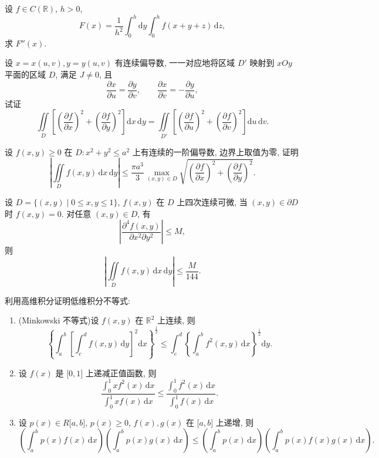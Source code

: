 \documentclass[../../数学分析培优讲义.tex]{subfiles}
\begin{document}
\begin{example}
设 $f\in C(\mathbb{R})$, $h>0$,
\[
    F(x)=\dfrac{1}{h^2}\int_0^h\mathrm{d}y\int_0^h f(x+y+z)\,\mathrm{d}z,
\]
求 $F''(x)$.
\end{example}
\exampleblank

\begin{example}
设 $x=x(u,v),y=y(u,v)$ 有连续偏导数, 一一对应地将区域 $D'$ 映射到 $xOy$ 平面的区域 $D$, 满足 $J\ne0$, 且
\[
    \dfrac{\partial x}{\partial u}=\dfrac{\partial y}{\partial v},\qquad
    \dfrac{\partial x}{\partial v}=-\dfrac{\partial y}{\partial u},
\]
试证
\[
    \iint\limits_D\left[\left(\dfrac{\partial f}{\partial x}\right)^2+
    \left(\dfrac{\partial f}{\partial y}\right)^2\right]\mathrm{d}x\,\mathrm{d}y
    =\iint\limits_{D'}\left[\left(\dfrac{\partial f}{\partial u}\right)^2+
    \left(\dfrac{\partial f}{\partial v}\right)^2\right]\mathrm{d}u\,\mathrm{d}v.
\]
\end{example}
\exampleblank

\begin{example}
设 $f(x,y)\geq0$ 在 $D:x^2+y^2\leq a^2$ 上有连续的一阶偏导数, 边界上取值为零, 证明
\[
    \left|\iint\limits_Df(x,y)\,\mathrm{d}x\,\mathrm{d}y\right|
    \leq\dfrac{\pi a^3}{3}
    \max_{(x,y)\in D}\sqrt{\left(\dfrac{\partial f}{\partial x}\right)^2+
    \left(\dfrac{\partial f}{\partial y}\right)^2}.
\]
\end{example}
\exampleblank

\begin{example}
设 $D=\{(x,y)\mid0\leq x,y\leq1\}$, $f(x,y)$ 在 $D$ 上四次连续可微, 当 $(x,y)\in\partial D$ 时 $f(x,y)=0$. 对任意 $(x,y)\in D$, 有
\[
    \left|\dfrac{\partial^4f(x,y)}{\partial x^2\partial y^2}\right|\leq M,
\]
则
\[
    \left|\iint\limits_Df(x,y)\,\mathrm{d}x\,\mathrm{d}y\right|\leq\dfrac{M}{144}.
\]
\end{example}
\exampleblank

\begin{example}[\markstar]
利用高维积分证明低维积分不等式:
\begin{enumerate}[label=(\arabic*)]
    \item (Minkowski 不等式)设 $f(x,y)$ 在 $\mathbb{R}^2$ 上连续, 则
    \[
        \left\{\int_a^b\left[\int_c^d f(x,y)\,\mathrm{d}y\right]^2\mathrm{d}x\right\}^{\frac{1}{2}}
        \leq
        \int_c^d\left\{\int_a^b f^2(x,y)\,\mathrm{d}x\right\}^{\frac{1}{2}}\mathrm{d}y.
    \]
    \item 设 $f(x)$ 是 $\lbrack0,1\rbrack$ 上递减正值函数, 则
    \[
        \dfrac{\displaystyle\int_0^1x f^2(x)\,\mathrm{d}x}
        {\displaystyle\int_0^1x f(x)\,\mathrm{d}x}
        \leq
        \dfrac{\displaystyle\int_0^1 f^2(x)\,\mathrm{d}x}
        {\displaystyle\int_0^1 f(x)\,\mathrm{d}x}.
    \]
    \item 设 $p(x)\in R\lbrack a,b\rbrack$, $p(x)\geq0$, $f(x),g(x)$ 在 $\lbrack a,b\rbrack$ 上递增, 则
    \[
        \left(\int_a^bp(x)f(x)\,\mathrm{d}x\right)
        \left(\int_a^bp(x)g(x)\,\mathrm{d}x\right)
        \leq
        \left(\int_a^bp(x)\,\mathrm{d}x\right)
        \left(\int_a^bp(x)f(x)g(x)\,\mathrm{d}x\right).
    \]
\end{enumerate}
\end{example}
\exampleblank
\end{document}
